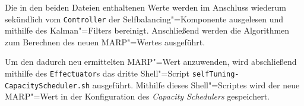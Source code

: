 Die in den beiden Dateien enthaltenen Werte werden im Anschluss wiederum sekündlich vom \texttt{Controller} der Selfbalancing"=Komponente ausgelesen und mithilfe des Kalman"=Filters bereinigt.
Anschließend werden die Algorithmen \cite{Zhang2016} zum Berechnen des neuen \gls{MARP}"=Wertes ausgeführt.

Um den dadurch neu ermittelten \gls{MARP}"=Wert anzuwenden, wird abschließend mithilfe des \texttt{Effectuator}s das dritte Shell"=Script \texttt{selfTuning-CapacityScheduler.sh} ausgeführt.
Mithilfe dieses Shell"=Scriptes wird der neue MARP"=Wert in der Konfiguration des \emph{Capacity Schedulers} gespeichert.
